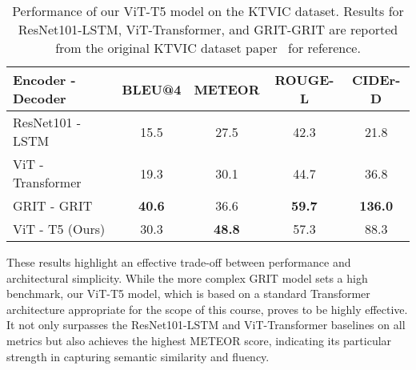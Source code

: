 \begin{table}[H]
  \centering
  \renewcommand{\arraystretch}{1.5}
  \normalsize
  \label{tab:ktvic_comparison}
  \begin{tabular}{lcccc}
    \hline
    \textbf{Encoder - Decoder} & \textbf{BLEU@4} &
    \textbf{METEOR} & \textbf{ROUGE-L} & \textbf{CIDEr-D} \\
    \hline
    ResNet101 - LSTM & 15.5 & 27.5 & 42.3 & 21.8   \\
    ViT - Transformer & 19.3 & 30.1 & 44.7 & 36.8    \\
    GRIT - GRIT & \textbf{40.6} & 36.6 & \textbf{59.7} & \textbf{136.0}    \\
    \hline
    ViT - T5 (Ours) & 30.3 & \textbf{48.8} & 57.3 & 88.3 \\
    \hline
  \end{tabular}
  \caption{Performance of our ViT-T5 model on the KTVIC dataset. Results for ResNet101-LSTM, ViT-Transformer, and GRIT-GRIT are reported from the original KTVIC dataset paper~\cite{pham2024ktvic} for reference.}
\end{table}

These results highlight an effective trade-off between performance and architectural simplicity. While the more complex GRIT model sets a high benchmark, our ViT-T5 model, which is based on a standard Transformer architecture appropriate for the scope of this course, proves to be highly effective. It not only surpasses the ResNet101-LSTM and ViT-Transformer baselines on all metrics but also achieves the highest METEOR score, indicating its particular strength in capturing semantic similarity and fluency.